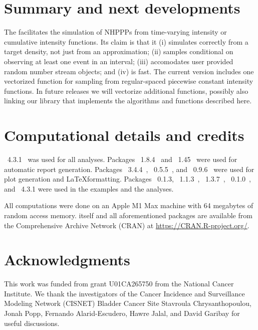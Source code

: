 \documentclass[article,nojss]{jss}\usepackage[]{graphicx}\usepackage[]{xcolor}
\begin{document}

\section{Summary and next developments} \label{sec:summary}

The  facilitates the simulation of NHPPPs from time-varying intensity or cumulative intensity functions. Its claim is that it (i) simulates correctly from a target density, not just from an approximation; (ii) samples conditional on observing at least one event in an interval; (iii) accomodates user provided random number stream objects; and (iv) is fast. The current version includes one vectorized function for sampling from regular-spaced piecewise constant intensity functions. In future releases we will vectorize additional functions, possibly also linking our  library that implements the algorithms and functions described here.



\section*{Computational details and credits}

~4.3.1~\citep{R-program}
was used for all analyses.
Packages
~{1.8.4}~\citep{xtable-package} and
~{1.45}~\citep{knitr-package}
were used for automatic report generation. Packages
~{3.4.4}~\citep{ggplot2-package},
~{0.5.5}~\citep{ggridges-package}, and
~{0.9.6}~\citep{latex2exp-package}
were used for plot generation and \LaTeX formatting.
Packages
~{0.1.3}, %
~{1.1.3}~\citep{bench-package},
~{1.3.7}~\citep{rstream-package},
~{0.1.0}~\citep{otinference-package}, and
~{4.3.1}
were used in the examples and the analyses.

All computations were done on an Apple M1 Max machine with 64 megabytes of random access memory.
%
 itself
and all aforementioned packages are available from the Comprehensive
 Archive Network (CRAN) at
\url{https://CRAN.R-project.org/}.


\section*{Acknowledgments}
This work was funded from grant U01CA265750 from the National Cancer Institute.
We thank the investigators of the Cancer Incidence and Surveillance Modeling Network (CISNET)
Bladder Cancer Site Stavroula Chrysanthopoulou, Jonah Popp, Fernando Alarid-Escudero,
Hawre Jalal, and David Garibay for useful discussions.
\end{document}
